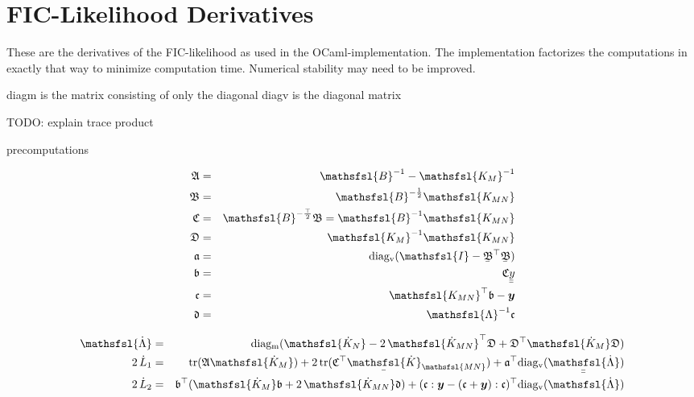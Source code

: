 \documentclass[12pt]{article}
\newcommand{\mat}[1]{\mbox{$\mathsfsl{#1}$}}
\renewcommand{\vec}[1]{\mbox{\boldmath$#1$}}
\newcommand{\dmat}[1]{\mat{\dot{{#1}}}}
\newcommand{\tr}{\mathrm{tr}}
\newcommand{\km}{\mat{K_{M}}}
\newcommand{\dkm}{\mat{\dot{K}_{M}}}
\newcommand{\dkn}{\mat{\dot{K}_{N}}}
\newcommand{\kmn}{\mat{K_{MN}}}
\newcommand{\dkmn}{\mat{\dot{K}_{MN}}}
\newcommand{\dukmn}{\myu{\mat{\dot{K}}}_{\mathsfsl{MN}}}
\newcommand{\lam}{\mat{\Lambda}}
\newcommand{\inv}[1]{#1^{-1}}
\newcommand{\ichol}[1]{#1^{-\frac{1}{2}}}
\newcommand{\myu}[1]{\underaccent{\bar}{#1}}
\newcommand{\myuu}[1]{\myu{\myu{#1}}}
\newcommand{\dlam}{\dmat{\Lambda}}
\newcommand{\dlamuu}{\myuu{\dmat{\Lambda}}}
\newcommand{\diagv}{\mathrm{diag_v}}
\newcommand{\diagm}{\mathrm{diag_m}}
\begin{document}
\section{FIC-Likelihood Derivatives}

These are the derivatives of the FIC-likelihood as used in the
OCaml-implementation.  The implementation factorizes the computations
in exactly that way to minimize computation time.  Numerical stability
may need to be improved.

diagm is the matrix consisting of only the diagonal
diagv is the diagonal matrix

TODO: explain trace product

precomputations

\begin{eqnarray*}
\mathfrak{A} & = & \mat{B}^{-1} - \mat{K_M}^{-1} \\
\mathfrak{B} & = & \ichol{\mat{B}}\kmn \\
\mathfrak{C} & = & \mat{B}^{-\frac{\top}{2}}\mathfrak{B} = \inv{\mat{B}}\kmn \\
\mathfrak{D} & = & \inv{\km}\kmn \\
\mathfrak{a} & = & \diagv(\mat{I} - \myu{\mathfrak{B}}^\top\myu{\mathfrak{B}}) \\
\mathfrak{b} & = & \mathfrak{C} \myuu{y} \\
\mathfrak{c} & = & \kmn^\top\mathfrak{b} - \vec{y} \\
\mathfrak{d} & = & \inv{\lam}\mathfrak{c} \\
\end{eqnarray*}

\begin{eqnarray*}
\dlam & = & \diagm(\dkn - 2\,\dkmn^\top\mathfrak{D} + \mathfrak{D}^\top\dkm\mathfrak{D}) \\
2\,\dot{L}_1 & = & \tr(\mathfrak{A}\dkm) + 2\,\tr({\mathfrak{C}^\top\dukmn}) + \mathfrak{a}^\top\diagv(\dlamuu) \\
2\,\dot{L}_2 & = & \mathfrak{b}^\top(\dkm\mathfrak{b} + 2\,\dkmn\mathfrak{d})
  + (\mathfrak{c}:\vec{y} - (\mathfrak{c} + \vec{y}) : \mathfrak{c})^\top\diagv(\dlam) \\
\end{eqnarray*}
\end{document}
